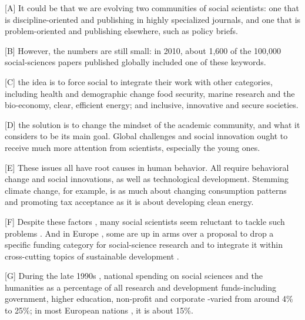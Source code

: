 \vspace{6pt}

[A] It could be that we are evolving two communities of social
scientists: one that is discipline-oriented and publishing in highly
specialized journals, and one that is problem-oriented and publishing
elsewhere, such as policy briefs.

[B] However, the numbers are still small: in 2010, about 1,600 of the 100,000 social-sciences papers published globally included one of these keywords.

[C] the idea is to force social to integrate their work with other categories, including health and demographic change food security, marine research and the bio-economy, clear, efficient energy; and inclusive, innovative and secure societies.

[D] the solution is to change the mindset of the academic community, and what it considers to be its main goal. Global challenges and social innovation ought to receive much more attention from scientists, especially the young ones.

[E] These issues all have root causes in human behavior. All require behavioral change and social innovations, as well as technological 
development. Stemming climate change, for example, is as much about changing consumption patterns and promoting tax acceptance as it is about developing clean energy.

[F] Despite these factors , many social scientists seem reluctant to tackle such problems . And in Europe , some are up in arms over a proposal to drop a specific funding category for social-science research and to integrate it within cross-cutting topics of sustainable development .

[G] During the late 1990s , national spending on social sciences and the humanities as a percentage of all research and development funds-including government, higher education, non-profit and corporate -varied from around 4\% to 25\%; in most European nations , it is about 15\%.
